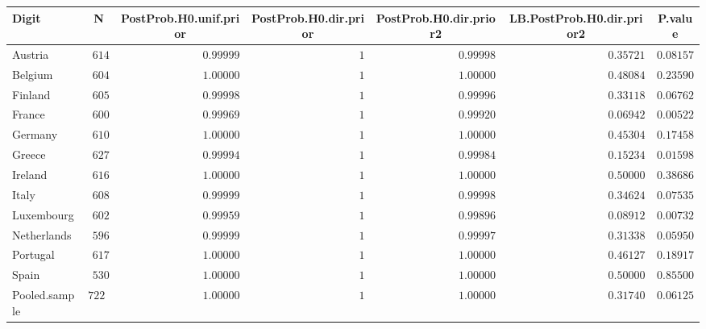 \begin{table}[!tbp]
\begin{center}
\begin{tabular}{lrrrrrr}
\hline\hline
\multicolumn{1}{l}{Digit}&\multicolumn{1}{c}{N}&\multicolumn{1}{c}{PostProb.H0.unif.prior}&\multicolumn{1}{c}{PostProb.H0.dir.prior}&\multicolumn{1}{c}{PostProb.H0.dir.prior2}&\multicolumn{1}{c}{LB.PostProb.H0.dir.prior2}&\multicolumn{1}{c}{P.value}\tabularnewline
\hline
Austria&$ 614$&$0.99999$&$1$&$0.99998$&$0.35721$&$0.08157$\tabularnewline
Belgium&$ 604$&$1.00000$&$1$&$1.00000$&$0.48084$&$0.23590$\tabularnewline
Finland&$ 605$&$0.99998$&$1$&$0.99996$&$0.33118$&$0.06762$\tabularnewline
France&$ 600$&$0.99969$&$1$&$0.99920$&$0.06942$&$0.00522$\tabularnewline
Germany&$ 610$&$1.00000$&$1$&$1.00000$&$0.45304$&$0.17458$\tabularnewline
Greece&$ 627$&$0.99994$&$1$&$0.99984$&$0.15234$&$0.01598$\tabularnewline
Ireland&$ 616$&$1.00000$&$1$&$1.00000$&$0.50000$&$0.38686$\tabularnewline
Italy&$ 608$&$0.99999$&$1$&$0.99998$&$0.34624$&$0.07535$\tabularnewline
Luxembourg&$ 602$&$0.99959$&$1$&$0.99896$&$0.08912$&$0.00732$\tabularnewline
Netherlands&$ 596$&$0.99999$&$1$&$0.99997$&$0.31338$&$0.05950$\tabularnewline
Portugal&$ 617$&$1.00000$&$1$&$1.00000$&$0.46127$&$0.18917$\tabularnewline
Spain&$ 530$&$1.00000$&$1$&$1.00000$&$0.50000$&$0.85500$\tabularnewline
Pooled.sample&$7229$&$1.00000$&$1$&$1.00000$&$0.31740$&$0.06125$\tabularnewline
\hline
\end{tabular}\end{center}
\end{table}
